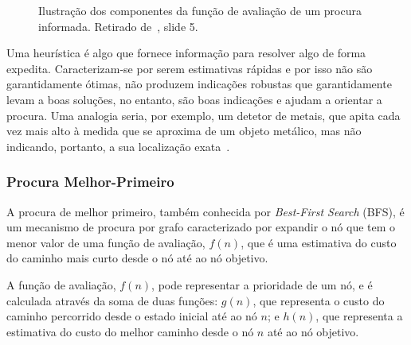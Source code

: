 \begin{figure}[H]
    \begin{center}
    \end{center}
    \caption{Ilustração dos componentes da função de avaliação de um procura informada. Retirado de~\cite{isel:iasa:slides:proc-espaco-estados-parte-3}, slide 5.}
    \label{fig:proc-informada}
\end{figure}

Uma heurística é algo que fornece informação para resolver algo de forma expedita.
Caracterizam-se por serem estimativas rápidas e por isso não são garantidamente ótimas, não produzem indicações robustas que garantidamente levam a boas soluções, no entanto, são boas indicações e ajudam a orientar a procura.
Uma analogia seria, por exemplo, um detetor de metais, que apita cada vez mais alto à medida que se aproxima de um objeto metálico, mas não indicando, portanto, a sua localização exata~\cite{ist:leic:resumos:procura-informada}.

\subsubsection{Procura Melhor-Primeiro}\label{subsubsec:procura-melhor-primeiro}

A procura de melhor primeiro, também conhecida por \textit{Best-First Search} (BFS), é um mecanismo de procura por grafo caracterizado por expandir o nó que tem o menor valor de uma função de avaliação, $f(n)$, que é uma estimativa do custo do caminho mais curto desde o nó até ao nó objetivo.

A função de avaliação, $f(n)$, pode representar a prioridade de um nó, e é calculada através da soma de duas funções: $g(n)$, que representa o custo do caminho percorrido desde o estado inicial até ao nó $n$; e $h(n)$, que representa a estimativa do custo do melhor caminho desde o nó $n$ até ao nó objetivo.

